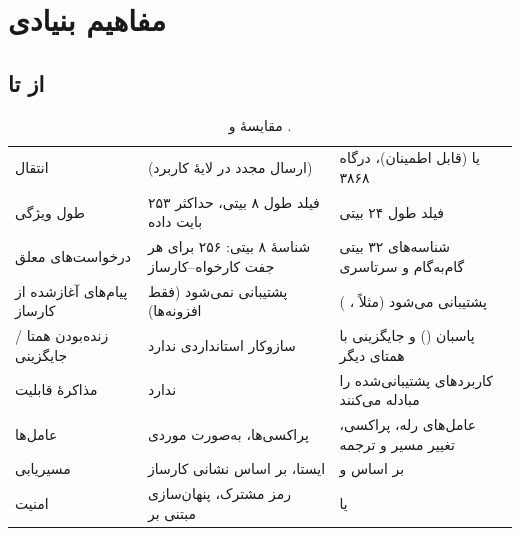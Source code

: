 \documentclass[11pt,a4paper]{article}
\begin{document}
\section{مفاهیم بنیادی}

\subsection{از  تا }
\begin{table}[htbp]
\centering\small
\caption{مقایسهٔ  و .}\label{tab:radius}
\begin{tabularx}{\linewidth}{@{}l Y Y@{}}
\toprule
{} &  &  \\
\midrule
انتقال              &  (ارسال مجدد در لایهٔ کاربرد) &  یا  (قابل اطمینان)، درگاه ۳۸۶۸ \\
طول ویژگی          & فیلد طول ۸ بیتی، حداکثر ۲۵۳ بایت داده & فیلد طول ۲۴ بیتی \\
درخواست‌های معلق    & شناسهٔ ۸ بیتی: ۲۵۶ برای هر جفت کارخواه--کارساز & شناسه‌های ۳۲ بیتی گام‌به‌گام و سرتاسری \\
پیام‌های آغازشده از کارساز & پشتیبانی نمی‌شود (فقط افزونه‌ها) & پشتیبانی می‌شود (مثلاً ، ) \\
زنده‌بودن همتا / جایگزینی & سازوکار استانداردی ندارد & پاسبان () و جایگزینی با همتای دیگر \\
مذاکرهٔ قابلیت      & ندارد                       &  کاربردهای پشتیبانی‌شده را مبادله می‌کنند \\
عامل‌ها             & پراکسی‌ها، به‌صورت موردی     & عامل‌های رله، پراکسی، تغییر مسیر و ترجمه \\
مسیریابی            & ایستا، بر اساس نشانی کارساز & بر اساس  و  \\
امنیت               & رمز مشترک، پنهان‌سازی مبتنی بر  &  یا  \\
\bottomrule
\end{tabularx}
\end{table}
\end{document}

